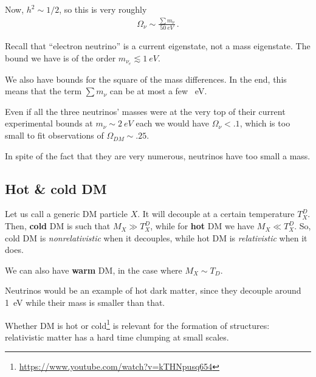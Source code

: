 \documentclass[main.tex]{subfiles}
\begin{document}
Now, \(h^2 \sim 1/2\), so this is very roughly 
%
\begin{align}
\Omega_{\nu } \sim \frac{\sum m_\nu }{\SI{50}{eV}}
\,.
\end{align}

Recall that ``electron neutrino'' is a current eigenstate, not a mass eigenstate. 
The bound we have is of the order \(m_{\nu_{e}} \lesssim \SI{1}{eV}\).

We also have bounds for the square of the mass differences. 
In the end, this means that the term \(\sum m_{\nu }\) can be at most a few \SI{}{eV}.

Even if all the three neutrinos' masses were at the very top of their current experimental bounds at \( m_\nu \sim \SI{2}{eV}\) each we would have \(\Omega_{\nu } < \num{.1}\), which is too small to fit observations of \(\Omega_{DM} \sim \num{.25}\). 

In spite of the fact that they are very numerous, neutrinos have too small a mass. 

\subsection{Hot \& cold DM}


Let us call a generic DM particle \(X\). It will decouple at a certain temperature \(T^{D}_{X}\). Then, \textbf{cold} DM is such that \(M_X \gg T_X^{D}\), while for \textbf{hot} DM we have \(M_X \ll T_X^{D}\). 
So, cold DM is \emph{nonrelativistic} when it decouples, while hot DM is \emph{relativistic} when it does.

We can also have \textbf{warm} DM, in the case where \(M_X \sim T_D\).



Neutrinos would be an example of hot dark matter, since they decouple around \SI{1}{eV} while their mass is smaller than that. 

Whether DM is hot or cold\footnote{\url{https://www.youtube.com/watch?v=kTHNpusq654}} is relevant for the formation of structures: relativistic matter has a hard time clumping at small scales. 
\end{document}

